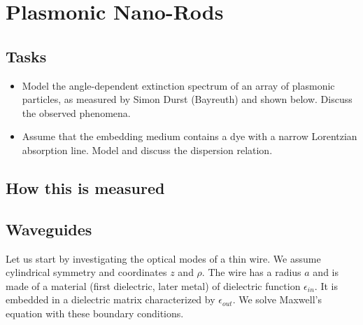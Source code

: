 \renewcommand{\lastmod}{December 3, 2021}
\renewcommand{\chapterauthors}{Markus Lippitz}


\chapter{Plasmonic Nano-Rods}

\section{Tasks}

\begin{itemize}
\item Model the angle-dependent extinction spectrum of an array of plasmonic particles, as measured by Simon Durst (Bayreuth) and shown below. Discuss the observed phenomena.

\item Assume that the embedding medium contains a dye with a narrow Lorentzian absorption line. Model and discuss the dispersion relation.
\end{itemize}



\section{How this is  measured}



\section{Waveguides}


Let us start by investigating the optical modes of a thin wire. We assume cylindrical symmetry and coordinates $z$ and $\rho$. The wire has a radius $a$ and is made of a material (first dielectric, later metal) of dielectric function $\epsilon_{in}$. It is embedded in a dielectric matrix characterized by $\epsilon_{out}$. We solve Maxwell's equation with these boundary conditions.

